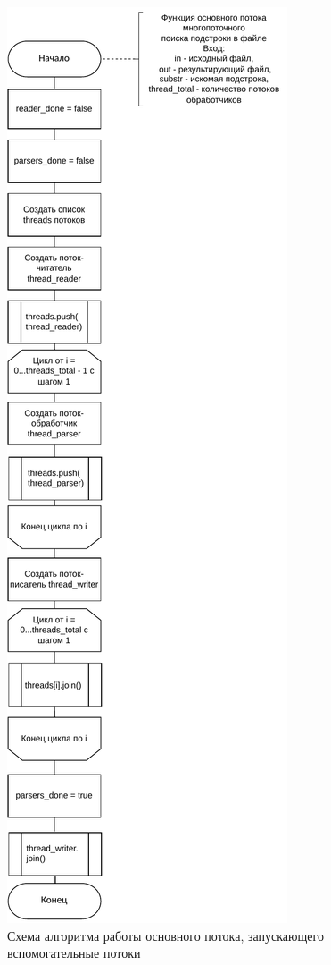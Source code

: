 \begin{figure}[h]
	\centering
	\includegraphics[height=0.9\textheight]{img/threads_main.pdf}
	\caption{Схема алгоритма работы основного потока, запускающего вспомогательные потоки}
	\label{fig:parallel}
\end{figure}


